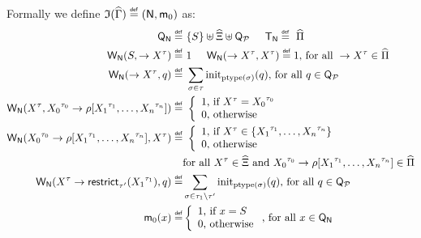 \begin{textAtEnd}[category=initial]
Formally we define $\mathfrak{I}({\widehat{\Gamma}}) \stackrel{\scriptscriptstyle{\mathsf{def}}}{=} (\mathsf{N},\mathsf{m}_0)$ as:
\begin{align*}
  \mathsf{Q}_{\mathsf{N}} \stackrel{\scriptscriptstyle{\mathsf{def}}}{=} & ~{\{ {S} \}} \uplus \widehat{\Xi} \uplus \mathsf{Q}_{\mathcal{P}} \hspace*{5mm}
  \mathsf{T}_{\mathsf{N}} \stackrel{\scriptscriptstyle{\mathsf{def}}}{=} ~\widehat{\Pi} \\
  \mathsf{W}_{\mathsf{N}}(S,\rightarrow {X}^{\tau}) \stackrel{\scriptscriptstyle{\mathsf{def}}}{=} & ~1 \hspace*{5mm}
  \mathsf{W}_{\mathsf{N}}(\rightarrow {X}^{\tau}, {X}^{\tau}) \stackrel{\scriptscriptstyle{\mathsf{def}}}{=} 1
  \text{, for all } \rightarrow {X}^{\tau} \in \widehat{\Pi}
  \\
  \mathsf{W}_{\mathsf{N}}(\rightarrow {X}^{\tau}, q) \stackrel{\scriptscriptstyle{\mathsf{def}}}{=} & ~\sum_{\sigma\in\tau} \mathrm{init}_{{\mathrm{ptype}({\sigma})}}(q)
  \text{, for all } q \in \mathsf{Q}_{\mathcal{P}}
  \\
  \mathsf{W}_{\mathsf{N}}({X}^{\tau},{X_0}^{\tau_0} \rightarrow \rho[{X_1}^{\tau_1},\ldots,{X_n}^{\tau_n}]) \stackrel{\scriptscriptstyle{\mathsf{def}}}{=} & ~\left\{\begin{array}{ll}
  1 \text{, if } {X}^{\tau} = {X_0}^{\tau_0} \\
  0 \text{, otherwise} 
  \end{array}\right.
  \\
  \mathsf{W}_{\mathsf{N}}({X_0}^{\tau_0} \rightarrow \rho[{X_1}^{\tau_1},\ldots,{X_n}^{\tau_n}], {X}^{\tau}) \stackrel{\scriptscriptstyle{\mathsf{def}}}{=} & ~\left\{\begin{array}{ll}
  1 \text{, if } {X}^{\tau} \in {\{ {{X_1}^{\tau_1}, \ldots, {X_n}^{\tau_n}} \}} \\
  0 \text{, otherwise} 
  \end{array}\right.
  \\
  & \text{for all } {X}^{\tau} \in \widehat{\Xi} \text{ and } {X_0}^{\tau_0} \rightarrow \rho[{X_1}^{\tau_1}, \ldots, {X_n}^{\tau_n}] \in \widehat{\Pi}
  \\
  \mathsf{W}_{\mathsf{N}}({X}^{\tau} \rightarrow \mathsf{restrict}^{}_{{\tau'}}({X_1}^{\tau_1}), q) \stackrel{\scriptscriptstyle{\mathsf{def}}}{=} & \sum_{\sigma\in\tau_1\setminus\tau'} \mathrm{init}_{{\mathrm{ptype}({\sigma})}}(q)
  \text{, for all } q \in \mathsf{Q}_{\mathcal{P}}
  \\
  \mathsf{m}_{0}(x) \stackrel{\scriptscriptstyle{\mathsf{def}}}{=} & \left\{\begin{array}{ll}
  1 \text{, if } x = S \\
  0 \text{, otherwise} 
  \end{array}\right. \text{, for all } x \in \mathsf{Q}_{\mathsf{N}}
\end{align*}
\ifLongVersion\else
\end{textAtEnd}
